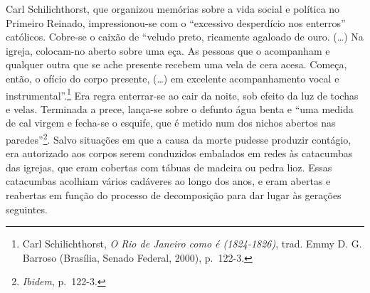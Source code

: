 Carl Schilichthorst, que organizou memórias sobre a vida social e
política no Primeiro Reinado, impressionou-se com o ``excessivo
desperdício nos enterros'' católicos. Cobre-se o caixão de ``veludo
preto, ricamente agaloado de ouro. (\ldots{}) Na igreja, colocam-no
aberto sobre uma eça. As pessoas que o acompanham e qualquer outra que
se ache presente recebem uma vela de cera acesa. Começa, então, o ofício
do corpo presente, (\ldots{}) em excelente acompanhamento vocal e
instrumental''.\footnote{Carl Schilichthorst, \emph{O Rio de Janeiro
  como é (1824-1826)}, trad. Emmy D. G. Barroso (Brasília, Senado
  Federal, 2000), p.~122-3.} Era regra enterrar-se ao cair da noite, sob
efeito da luz de tochas e velas. Terminada a prece, lança-se sobre o
defunto água benta e ``uma medida de cal virgem e fecha-se o esquife,
que é metido num dos nichos abertos nas paredes''\footnote{\emph{Ibidem},
  p.~122-3.}. Salvo situações em que a causa da morte pudesse produzir
contágio, era autorizado aos corpos serem conduzidos embalados em redes
às catacumbas das igrejas, que eram cobertas com tábuas de madeira ou
pedra lioz. Essas catacumbas acolhiam vários cadáveres ao longo dos
anos, e eram abertas e reabertas em função do processo de decomposição
para dar lugar às gerações seguintes.

